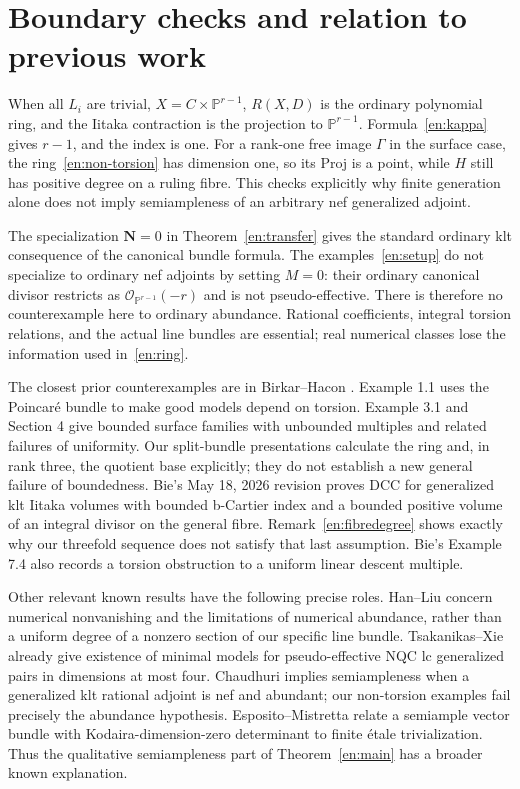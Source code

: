 \documentclass[12pt]{amsart}
\theoremstyle{definition}
\theoremstyle{remark}
\numberwithin{equation}{section}
\newcommand{\cO}{\mathcal{O}}
\newcommand{\mP}{\mathbb{P}}
\newcommand{\bN}{\mathbf N}
\begin{document}
\section{Boundary checks and relation to previous work}\label{en:checks}
When all $L_i$ are trivial, $X=C\times\mP^{r-1}$, $R(X,D)$ is the ordinary polynomial ring, and the Iitaka contraction is the projection to $\mP^{r-1}$. Formula~\eqref{en:kappa} gives $r-1$, and the index is one. For a rank-one free image $\Gamma$ in the surface case, the ring~\eqref{en:non-torsion} has dimension one, so its Proj is a point, while $H$ still has positive degree on a ruling fibre. This checks explicitly why finite generation alone does not imply semiampleness of an arbitrary nef generalized adjoint.

The specialization $\bN=0$ in Theorem~\ref{en:transfer} gives the standard ordinary klt consequence of the canonical bundle formula. The examples~\eqref{en:setup} do not specialize to ordinary nef adjoints by setting $M=0$: their ordinary canonical divisor restricts as $\cO_{\mP^{r-1}}(-r)$ and is not pseudo-effective. There is therefore no counterexample here to ordinary abundance. Rational coefficients, integral torsion relations, and the actual line bundles are essential; real numerical classes lose the information used in~\eqref{en:ring}.

The closest prior counterexamples are in Birkar--Hacon \cite{en-BH}. Example 1.1 uses the Poincar\'e bundle to make good models depend on torsion. Example 3.1 and Section 4 give bounded surface families with unbounded multiples and related failures of uniformity. Our split-bundle presentations calculate the ring and, in rank three, the quotient base explicitly; they do not establish a new general failure of boundedness. Bie's May 18, 2026 revision \cite[Theorem 1.7]{en-Bie} proves DCC for generalized klt Iitaka volumes with bounded b-Cartier index and a bounded positive volume of an integral divisor on the general fibre. Remark~\ref{en:fibredegree} shows exactly why our threefold sequence does not satisfy that last assumption. Bie's Example 7.4 also records a torsion obstruction to a uniform linear descent multiple.

Other relevant known results have the following precise roles. Han--Liu \cite[Theorem 1.5 and \S3.3]{en-HL} concern numerical nonvanishing and the limitations of numerical abundance, rather than a uniform degree of a nonzero section of our specific line bundle. Tsakanikas--Xie \cite[Corollary E]{en-TX} already give existence of minimal models for pseudo-effective NQC lc generalized pairs in dimensions at most four. Chaudhuri \cite[Theorem 2]{en-Cha} implies semiampleness when a generalized klt rational adjoint is nef and abundant; our non-torsion examples fail precisely the abundance hypothesis. Esposito--Mistretta \cite[Theorem 3.10]{en-EM} relate a semiample vector bundle with Kodaira-dimension-zero determinant to finite \'etale trivialization. Thus the qualitative semiampleness part of Theorem~\ref{en:main} has a broader known explanation.
\end{document}
